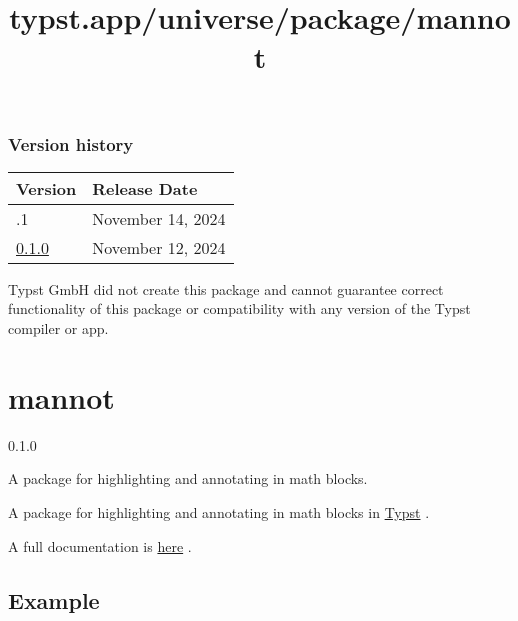 \label{versions}
\subsubsection{Version history}\label{version-history}

\begin{longtable}[]{@{}ll@{}}
\toprule\noalign{}
Version & Release Date \\
\midrule\noalign{}
\endhead
\bottomrule\noalign{}
\endlastfoot
0.1.1 & November 14, 2024 \\
\href{https://typst.app/universe/package/derive-it/0.1.0/}{0.1.0} &
November 12, 2024 \\
\end{longtable}

Typst GmbH did not create this package and cannot guarantee correct
functionality of this package or compatibility with any version of the
Typst compiler or app.


\title{typst.app/universe/package/mannot}

\label{banner}
\section{mannot}\label{mannot}

{ 0.1.0 }

A package for highlighting and annotating in math blocks.

\label{readme}
A package for highlighting and annotating in math blocks in
\href{https://typst.app/}{Typst} .

A full documentation is
\href{https://github.com/typst/packages/raw/main/packages/preview/mannot/0.1.0/docs/doc.pdf}{here}
.

\subsection{Example}\label{example}

\begin{Shaded}
\begin{Highlighting}[]
\NormalTok{$}

\NormalTok{$}
\end{Highlighting}
\end{Shaded}

